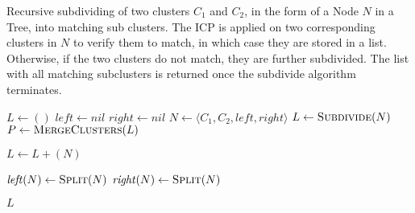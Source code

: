 \begin{algorithm}[tbp]
	\caption{Recursive subdividing of two clusters $C_1$ and $C_2$, in the form of a Node $\mathit{N}$ in a Tree, into matching sub clusters. The ICP is applied on two corresponding clusters in $\mathit{N}$ to verify them to match, in which case they are stored in a list. Otherwise, if the two clusters do not match, they are further subdivided. The list with all matching subclusters is returned once the subdivide algorithm terminates.}
	\label{alg:subdivide}
	
		\begin{algorithmic}[1]     %
			\label{clusterTree}
			
			\State $L \gets ()$
			\State $\mathit{left} \gets \mathit{nil}$
			\State $\mathit{right} \gets \mathit{nil}$
			\State $N \gets \langle C_1, C_2, \mathit{left}, \mathit{right}\rangle$
			\State $L \gets \Call{Subdivide}{N}$
			\State $P \gets \Call{MergeClusters}{L}$
			
			\EndProcedure
		\end{algorithmic}
	
	\begin{algorithmic}[1]     %
		\label{subdivide}
		
		\State $L \gets L + (N)$
		
		\Else
		\State $\mathit{left}(N) \gets \Call{Split}{N}$
		\State $\mathit{right}(N) \gets \Call{Split}{N}$
		\State {}
		\State {}
		\EndIf
		
		\State\Return $L$
		\EndProcedure
			
	\end{algorithmic}
\end{algorithm}

